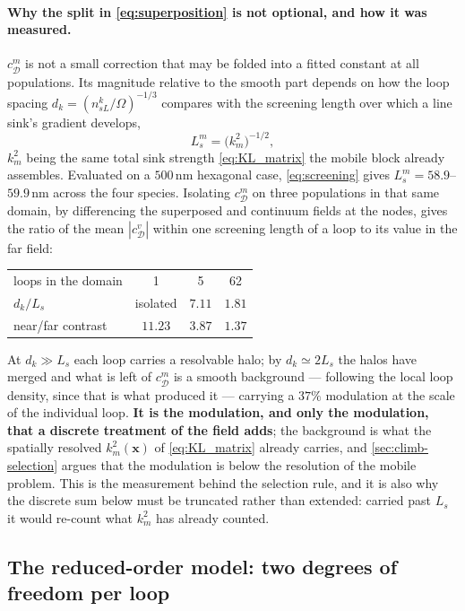 \documentclass{article}
\begin{document}
\paragraph{Why the split in \cref{eq:superposition} is not optional, and how it
was measured.} $c^m_{\mathcal D}$ is not a small correction that may be folded
into a fitted constant at all populations. Its magnitude relative to the smooth
part depends on how the loop spacing $d_k=(n^k_{sL}/\Omega)^{-1/3}$ compares with
the screening length over which a line sink's gradient develops,
\begin{equation}
  L_s^m=\bigl(k_m^2\bigr)^{-1/2},
  \label{eq:screening}
\end{equation}
$k^2_m$ being the same total sink strength \cref{eq:KL_matrix} the mobile block
already assembles. Evaluated on a $500$\,nm hexagonal case, \cref{eq:screening}
gives $L^m_s=58.9$--$59.9$\,nm across the four species. Isolating
$c^m_{\mathcal D}$ on three populations in that same domain, by differencing the
superposed and continuum fields at the nodes, gives the ratio of the mean
$|c^v_{\mathcal D}|$ within one screening length of a loop to its value in the
far field:
\begin{center}\small
\begin{tabular}{@{}lccc@{}}
\toprule
loops in the domain & 1 & 5 & 62\\
$d_k/L_s$ & isolated & $7.11$ & $1.81$\\
near/far contrast & $11.23$ & $3.87$ & $\mathbf{1.37}$\\
\bottomrule
\end{tabular}
\end{center}
At $d_k\gg L_s$ each loop carries a resolvable halo; by $d_k\simeq2L_s$ the
halos have merged and what is left of $c^m_{\mathcal D}$ is a smooth background
--- following the local loop density, since that is what produced it --- carrying
a $37\%$ modulation at the scale of the individual loop. \textbf{It is the
modulation, and only the modulation, that a discrete treatment of the field
adds}; the background is what the spatially resolved $k^2_m(\bm x)$ of
\cref{eq:KL_matrix} already carries, and \cref{sec:climb-selection} argues that
the modulation is below the resolution of the mobile problem. This is the
measurement behind the selection rule, and it is also why the discrete sum below
must be truncated rather than extended: carried past $L_s$ it would re-count what
$k^2_m$ has already counted.

\subsection{The reduced-order model: two degrees of freedom per loop}
\label{sec:ellipse-rom}
\end{document}
